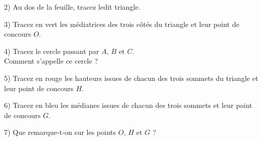 \documentclass[14pt]{extreport}
\theoremstyle{plain}
\begin{document}
\dotfill

2) Au dos de la feuille, tracez ledit triangle. 

3) Tracez en vert les médiatrices des trois côtés du triangle et leur point de concours $O$. 

4) Tracez le cercle passant par $A$, $B$ et $C$. \\Comment s'appelle ce cercle ? \dotfill 

5) Tracez en rouge les hauteurs issues de chacun des trois sommets du triangle et leur point de concours $H$. 

6) Tracez en bleu les médianes issues de chacun des trois sommets et leur point de concours $G$. 

7) Que remarque-t-on sur les points $O$, $H$ et $G$ ? \dotfill 

 \  \dotfill
\end{document}
